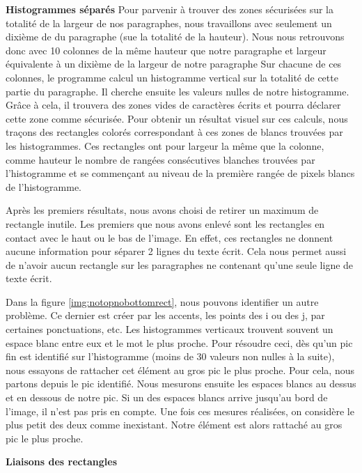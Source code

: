 \documentclass[12pt,a4paper]{article}
\begin{document}
\bigbreak\textbf{Histogrammes séparés}\bigbreak
Pour parvenir à trouver des zones sécurisées sur la totalité de la largeur de nos paragraphes, nous travaillons avec seulement un dixième de du paragraphe (sue la totalité de la hauteur). Nous nous retrouvons donc avec 10 colonnes de la même hauteur que notre paragraphe et largeur équivalente à un dixième de la largeur de notre paragraphe\bigbreak
Sur chacune de ces colonnes, le programme calcul un histogramme vertical sur la totalité de cette partie du paragraphe. Il cherche ensuite les valeurs nulles de notre histogramme. Grâce à cela, il trouvera des zones vides de caractères écrits et pourra déclarer cette zone comme sécurisée.\bigbreak
Pour obtenir un résultat visuel sur ces calculs, nous traçons des rectangles colorés correspondant à ces zones de blancs trouvées par les histogrammes. Ces rectangles ont pour largeur la même que la colonne, comme hauteur le nombre de rangées consécutives blanches trouvées par l'histogramme et se commençant au niveau de la première rangée de pixels blancs de l'histogramme.\bigbreak


Après les premiers résultats, nous avons choisi de retirer un maximum de rectangle inutile. Les premiers que nous avons enlevé sont les rectangles en contact avec le haut ou le bas de l'image. En effet, ces rectangles ne donnent aucune information pour séparer 2 lignes du texte écrit. Cela nous permet aussi de n'avoir aucun rectangle sur les paragraphes ne contenant qu'une seule ligne de texte écrit.\bigbreak


Dans la figure \ref{img:notopnobottomrect}, nous pouvons identifier un autre problème. Ce dernier est créer par les accents, les points des \og i\fg{} ou des \og j\fg, par certaines ponctuations, etc. Les histogrammes verticaux trouvent souvent un espace blanc entre eux et le mot le plus proche. Pour résoudre ceci, dès qu'un pic fin est identifié sur l'histogramme (moins de 30 valeurs non nulles à la suite), nous essayons de rattacher cet élément au gros pic le plus proche.\bigbreak
Pour cela, nous partons depuis le pic identifié. Nous mesurons ensuite les espaces blancs au dessus et en dessous de notre pic. Si un des espaces blancs arrive jusqu'au bord de l'image, il n'est pas pris en compte. Une fois ces mesures réalisées, on considère le plus petit des deux comme inexistant. Notre élément est alors rattaché au gros pic le plus proche.\bigbreak


\newpage

\bigbreak\textbf{Liaisons des rectangles}\bigbreak
\end{document}
